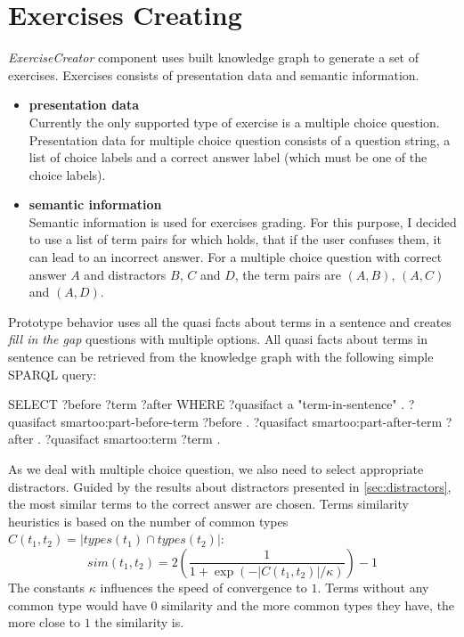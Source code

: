\documentclass[12pt, twoside]{fithesis2}
\renewcommand{\_}{\leavevmode \kern0.07em\vbox{\hrule width0.4em}}
\newcommand{\squarebullet}{\textcolor{black}{\raisebox{0.15em}{\rule{4pt}{4pt}}}}
\newcommand{\emptysquarebullet}{\textcolor{black}{\raisebox{0.10em}{\tiny$\square$}}}
\newenvironment{myItemize}{
  \begin{itemize}[leftmargin=2em,rightmargin=1em,itemsep=\parskip ,parsep=0em,topsep=0em,partopsep=0em]
  \renewcommand{\labelitemi}{\squarebullet}
  \renewcommand{\labelitemii}{\textbullet}
}{
  \end{itemize}
}
\newcounter{choice}
\begin{document}
\section{Exercises Creating}
\label{sec:smartoo-exercises}

\textit{ExerciseCreator} component uses built knowledge graph to generate a set of exercises.
Exercises consists of presentation data and semantic information.
\begin{myItemize}
  \item \textbf{presentation data}\\
    Currently the only supported type of exercise is a multiple choice question. Presentation data for multiple choice question consists of a question string, a list of choice labels and a correct answer label (which must be one of the choice labels).
  \item \textbf{semantic information}\\
    Semantic information is used for exercises grading. For this purpose, I decided to use a list of term pairs for which holds, that if the user confuses them, it can lead to an incorrect answer.
    For a multiple choice question with correct answer $A$ and distractors $B$, $C$ and $D$,
    the term pairs are $(A, B)$, $(A, C)$ and $(A, D)$.
\end{myItemize}


Prototype behavior uses all the quasi facts about terms in a sentence and creates \emph{fill in the gap} questions with multiple options.
All quasi facts about terms in sentence can be retrieved from the knowledge graph with the following simple SPARQL query:
\begin{code}
SELECT ?before ?term ?after
WHERE {
    ?quasifact a "term-in-sentence" .
    ?quasifact smartoo:part-before-term ?before .
    ?quasifact smartoo:part-after-term ?after .
    ?quasifact smartoo:term ?term .
}
\end{code}

As we deal with multiple choice question, we also need to select appropriate distractors.
Guided by the results about distractors presented in \autoref{sec:distractors},
the most similar terms to the correct answer are chosen.
Terms similarity heuristics is based on the number of common types
$C(t_1, t_2) = |types(t_1) \cap types(t_2)|$:
$$
sim(t_1, t_2) = 2 \left( \frac{1}{1 + \exp({-|C(t_1, t_2)| / \kappa})} \right) - 1
$$
The constants $\kappa$ influences the speed of convergence to $1$.
Terms without any common type would have $0$ similarity and the more common types they have, the more close to $1$ the similarity is.
\end{document}
